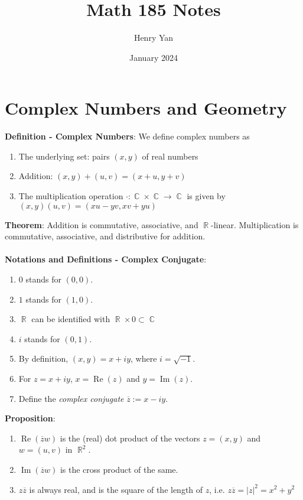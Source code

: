 \documentclass{article}
\title{Math 185 Notes}
\author{Henry Yan}
\date{January 2024}
\DeclareMathOperator{\R}{\mathbb{R}}
\DeclareMathOperator{\C}{\mathbb{C}}
\DeclareMathOperator{\re}{Re}
\DeclareMathOperator{\im}{Im}
\begin{document}
\maketitle

\section*{Complex Numbers and Geometry}
\textbf{Definition - Complex Numbers}: We define complex numbers as \begin{enumerate}
    \item The underlying set: pairs $(x, y)$ of real numbers
    \item Addition: $(x, y) + (u, v) = (x + u, y + v)$
    \item The multiplication operation $\cdot: \C \times \C \rightarrow \C$ is given by $(x, y)(u, v) = (xu - yv, xv + yu)$
\end{enumerate} $ $ \\
\textbf{Theorem}: Addition is commutative, associative, and $\R$-linear. Multiplication is commutative, associative, and distributive for addition. \\ \\
\textbf{Notations and Definitions - Complex Conjugate}: \begin{enumerate}
    \item $0$ stands for $(0, 0)$.
    \item $1$ stands for $(1, 0)$.
    \item $\R$ can be identified with $\R \times 0 \subset \C$
    \item $i$ stands for $(0, 1).$
    \item By definition, $(x, y) = x + iy$, where $i = \sqrt{-1}$.
    \item For $z = x + iy$, $x = \re(z)$ and $y = \im(z)$.
    \item Define the \textit{complex conjugate} $\overline{z} := x - iy.$
\end{enumerate} $ $ \\
\textbf{Proposition}: \begin{enumerate}
    \item $\re(\overline{z}w)$ is the (real) dot product of the vectors $z = (x, y)$ and $w = (u, v)$ in $\R^2$. 
    \item $\im(\overline{z}w)$ is the cross product of the same.
    \item $z\overline{z}$ is always real, and is the square of the length of $z$, i.e. $z\overline{z} = |z|^2 = x^2 + y^2$
\end{enumerate} $ $ \\
\end{document}
